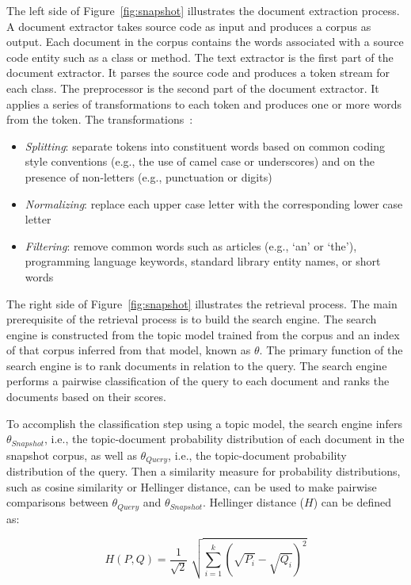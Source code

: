 The left side of Figure~\ref{fig:snapshot} illustrates the document extraction process.
A document extractor takes source code as input and produces a corpus as output.
Each document in the corpus contains the words associated with a source code entity
such as a class or method.
The text extractor is the first part of the document extractor.
It parses the source code and produces a token stream for each class.
The preprocessor is the second part of the document extractor.
It applies a series of transformations to each token and
produces one or more words from the token.
The transformations~\cite{Marcus-etal:2004,Marcus-Menzies:2010}: %
\begin{itemize}
    \item {\it Splitting}: separate tokens into constituent words
        based on common coding style conventions (e.g., the use of camel case or underscores)
        and on the presence of non-letters (e.g., punctuation or digits)
    \item {\it Normalizing}: replace each upper case letter with the corresponding lower case letter
    \item {\it Filtering}: remove common words such as articles (e.g., `an' or `the'),
        programming language keywords, standard library entity names, or short words
\end{itemize}

The right side of Figure~\ref{fig:snapshot} illustrates the retrieval process.
The main prerequisite of the retrieval process is to build the search engine.
The search engine is constructed from the topic model trained from the corpus
and an index of that corpus inferred from that model, known as $\theta$.
The primary function of the search engine is to rank documents in relation to the query.
The search engine performs a pairwise classification of the query
to each document and ranks the documents based on their scores.

To accomplish the classification step using a topic model,
the search engine infers $\theta_{Snapshot}$, i.e.,
the topic-document probability distribution of each document in the snapshot corpus,
as well as $\theta_{Query}$, i.e., the topic-document probability distribution of the query.
Then a similarity measure for probability distributions, such as
cosine similarity or Hellinger distance, can be used to make pairwise comparisons
between $\theta_{Query}$ and $\theta_{Snapshot}$.
Hellinger distance ($H$) can be defined as:

\begin{equation}
    H(P, Q) = \frac{1}{\sqrt{2}} \; \sqrt{\sum_{i=1}^{k} (\sqrt{P_i} - \sqrt{Q_i})^2}
\end{equation}

